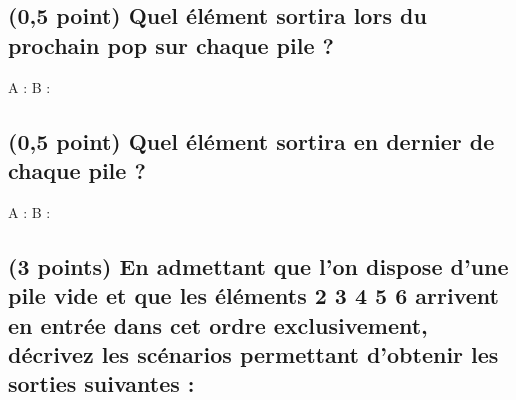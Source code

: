 \documentclass[11pt,a4paper]{article}
\begin{document}
\bigskip


\subsection{(0,5 point) Quel élément sortira lors du prochain \og pop \fg{} sur chaque pile ? }

\bigskip
\bigskip

\begin{Large}
A :  \hspace{8cm}  B :
\end{Large}

\bigskip
\bigskip


\subsection{(0,5 point) Quel élément sortira en dernier de chaque pile ? }

\bigskip
\bigskip

\begin{Large}
A :  \hspace{8cm}  B :
\end{Large}

\bigskip
\bigskip



\hspace{0pt}
\vfill

\newpage

\subsection{(3 points) En admettant que l'on dispose d'une pile vide et que les éléments  2 3 4 5 6 \fg{} arrivent en entrée dans cet ordre exclusivement, décrivez les scénarios permettant d'obtenir les sorties suivantes : }
%
%
\end{document}
